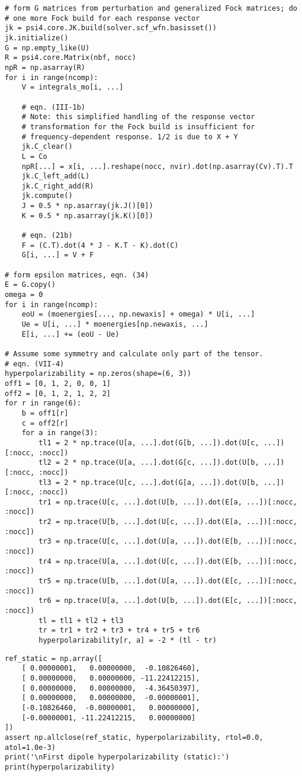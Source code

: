 \documentclass[]{article}
\begin{document}
\begin{verbatim}
# form G matrices from perturbation and generalized Fock matrices; do
# one more Fock build for each response vector
jk = psi4.core.JK.build(solver.scf_wfn.basisset())
jk.initialize()
G = np.empty_like(U)
R = psi4.core.Matrix(nbf, nocc)
npR = np.asarray(R)
for i in range(ncomp):
    V = integrals_mo[i, ...]

    # eqn. (III-1b)
    # Note: this simplified handling of the response vector
    # transformation for the Fock build is insufficient for
    # frequency-dependent response. 1/2 is due to X + Y
    jk.C_clear()
    L = Co
    npR[...] = x[i, ...].reshape(nocc, nvir).dot(np.asarray(Cv).T).T
    jk.C_left_add(L)
    jk.C_right_add(R)
    jk.compute()
    J = 0.5 * np.asarray(jk.J()[0])
    K = 0.5 * np.asarray(jk.K()[0])

    # eqn. (21b)
    F = (C.T).dot(4 * J - K.T - K).dot(C)
    G[i, ...] = V + F

# form epsilon matrices, eqn. (34)
E = G.copy()
omega = 0
for i in range(ncomp):
    eoU = (moenergies[..., np.newaxis] + omega) * U[i, ...]
    Ue = U[i, ...] * moenergies[np.newaxis, ...]
    E[i, ...] += (eoU - Ue)

# Assume some symmetry and calculate only part of the tensor.
# eqn. (VII-4)
hyperpolarizability = np.zeros(shape=(6, 3))
off1 = [0, 1, 2, 0, 0, 1]
off2 = [0, 1, 2, 1, 2, 2]
for r in range(6):
    b = off1[r]
    c = off2[r]
    for a in range(3):
        tl1 = 2 * np.trace(U[a, ...].dot(G[b, ...]).dot(U[c, ...])[:nocc, :nocc])
        tl2 = 2 * np.trace(U[a, ...].dot(G[c, ...]).dot(U[b, ...])[:nocc, :nocc])
        tl3 = 2 * np.trace(U[c, ...].dot(G[a, ...]).dot(U[b, ...])[:nocc, :nocc])
        tr1 = np.trace(U[c, ...].dot(U[b, ...]).dot(E[a, ...])[:nocc, :nocc])
        tr2 = np.trace(U[b, ...].dot(U[c, ...]).dot(E[a, ...])[:nocc, :nocc])
        tr3 = np.trace(U[c, ...].dot(U[a, ...]).dot(E[b, ...])[:nocc, :nocc])
        tr4 = np.trace(U[a, ...].dot(U[c, ...]).dot(E[b, ...])[:nocc, :nocc])
        tr5 = np.trace(U[b, ...].dot(U[a, ...]).dot(E[c, ...])[:nocc, :nocc])
        tr6 = np.trace(U[a, ...].dot(U[b, ...]).dot(E[c, ...])[:nocc, :nocc])
        tl = tl1 + tl2 + tl3
        tr = tr1 + tr2 + tr3 + tr4 + tr5 + tr6
        hyperpolarizability[r, a] = -2 * (tl - tr)
\end{verbatim}

\begin{verbatim}
ref_static = np.array([
    [ 0.00000001,   0.00000000,  -0.10826460],
    [ 0.00000000,   0.00000000, -11.22412215],
    [ 0.00000000,   0.00000000,  -4.36450397],
    [ 0.00000000,   0.00000000,  -0.00000001],
    [-0.10826460,  -0.00000001,   0.00000000],
    [-0.00000001, -11.22412215,   0.00000000]
])
assert np.allclose(ref_static, hyperpolarizability, rtol=0.0, atol=1.0e-3)
print('\nFirst dipole hyperpolarizability (static):')
print(hyperpolarizability)
\end{verbatim}
\end{document}
